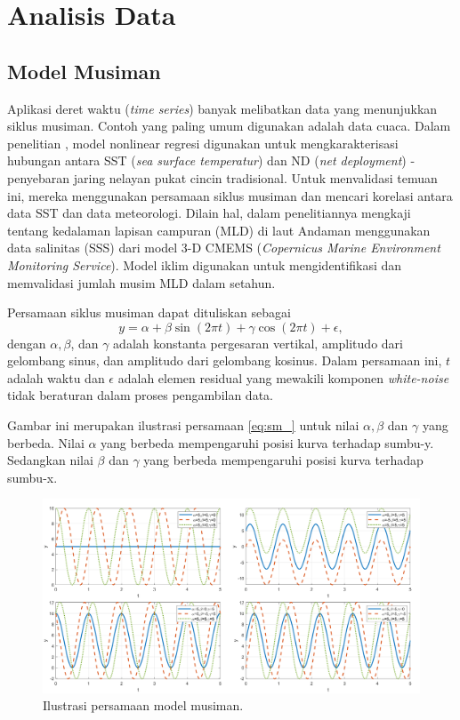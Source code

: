 \section[Analisis Data]{Analisis Data}
\begin{spacing}{1.5}
	\subsection[Model Musiman]{Model Musiman}
	Aplikasi deret waktu (\textit{time series}) banyak melibatkan data yang menunjukkan siklus musiman. Contoh yang paling umum digunakan adalah data cuaca. Dalam penelitian  \citeyear{Haridhi2016}, model nonlinear regresi digunakan untuk mengkarakterisasi hubungan antara SST (\textit{sea surface temperatur}) dan ND (\textit{net deployment}) - penyebaran jaring nelayan pukat cincin tradisional. Untuk menvalidasi temuan ini, mereka menggunakan persamaan siklus musiman  dan mencari korelasi antara data SST dan data meteorologi. Dilain hal,  \citeyear{Ikhwan2022} dalam penelitiannya mengkaji tentang kedalaman lapisan campuran (MLD) di laut Andaman menggunakan data salinitas (SSS) dari model 3-D CMEMS (\textit{Copernicus Marine Environment Monitoring Service}). Model iklim digunakan untuk mengidentifikasi dan memvalidasi jumlah musim MLD dalam setahun. 
	
	 Persamaan siklus musiman \cite{crawley2012r} dapat dituliskan sebagai
	\begin{equation}\label{eq:sm_}
		y = \alpha + \beta \sin(2\pi t)+\gamma \cos(2\pi t) + \epsilon,
	\end{equation}
	dengan $\alpha, \beta$, dan $\gamma$  adalah konstanta pergesaran vertikal, amplitudo dari gelombang sinus, dan amplitudo dari gelombang kosinus. Dalam persamaan ini, $t$ adalah waktu dan $\epsilon$ adalah elemen residual yang mewakili komponen \textit{white-noise} tidak beraturan dalam proses pengambilan data. 
	
	Gambar ini merupakan ilustrasi persamaan \ref{eq:sm_} untuk nilai $\alpha,\beta$ dan $\gamma$ yang berbeda. Nilai $\alpha$ yang berbeda mempengaruhi posisi kurva terhadap sumbu-y. Sedangkan nilai $\beta$ dan $\gamma$ yang berbeda mempengaruhi posisi kurva terhadap sumbu-x.
	\begin{figure}[H]
		\centering
		\includegraphics[width=15cm]{contents/Figures/sm_experiment}
		\caption{Ilustrasi persamaan model musiman.}
		\label{fig:sm}
	\end{figure}
	

\end{spacing}
